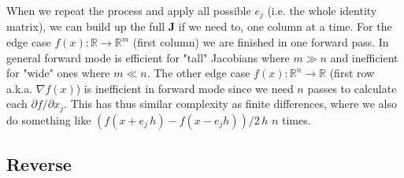 \documentclass[paper=a4,11pt,headsepline]{scrartcl}
\newcommand{\ve}[1]{\ensuremath{\bm{\mathit{#1}}}}
\newcommand{\ma}[1]{\ensuremath{\bm{\mathbf{#1}}}}
\newcommand{\ra}{\ensuremath{\rightarrow}}
\newcommand{\pdi}[2]{\partial #1/\partial #2}
\begin{document}
When we repeat the process and apply all possible $\ve e_j$ (i.e. the whole
identity matrix), we can build up the full $\ma J$ if we need to, one column at
a time. For the edge case $\ve f(x): \mathbb R \ra \mathbb R^m$ (first column)
we are finished in one forward pass. In general forward mode is efficient for
"tall" Jacobians where $m\gg n$ and inefficient for "wide" ones where $m\ll n$.
The other edge case $f(\ve x): \mathbb R^n \ra \mathbb R$ (first row a.k.a.
$\nabla f(\ve x)$) is inefficient in forward mode since we need $n$ passes to
calculate each $\pdi{f}{x_j}$. This has thus similar complexity as finite
differences, where we also do something like $(f(\ve x +\ve e_j\,h) - f(\ve
x-\ve e_j h))/2\,h$ $n$ times.

\subsection{Reverse}
\end{document}
